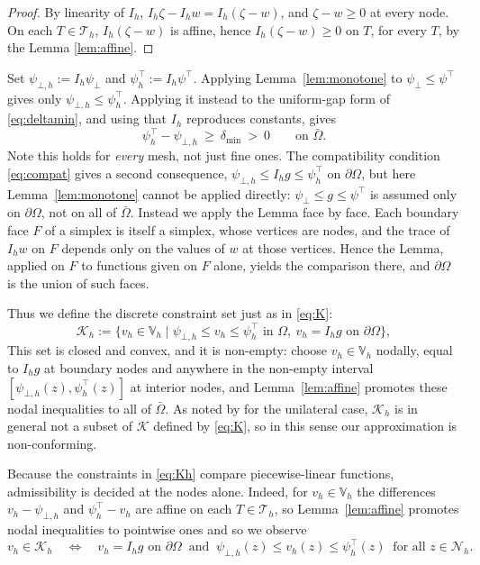 \documentclass[12pt]{amsart}
\theoremstyle{definition}
\newcommand{\Om}{\Omega}
\newcommand{\dOm}{\partial\Omega}
\newcommand{\psilo}{\psi_\bot}
\newcommand{\psiup}{\psi^\top}
\newcommand{\psiloh}{\psi_{\bot,h}}
\newcommand{\psiuph}{\psi^\top_h}
\newcommand{\Th}{\mathcal{T}_h}
\newcommand{\Vh}{\mathbb{V}_h}
\newcommand{\Nh}{\mathcal{N}_h}
\newcommand{\Ih}{I_h}
\newcommand{\Kh}{\mathcal{K}_h}
\begin{document}
\begin{proof}
By linearity of $\Ih$, $\Ih \zeta - \Ih w = \Ih(\zeta - w)$, and $\zeta - w \ge 0$ at every node. On each $T \in \Th$, $\Ih(\zeta-w)$ is affine, hence $\Ih(\zeta-w) \ge 0$ on $T$, for every $T$, by the Lemma \ref{lem:affine}.
\end{proof}

Set $\psiloh := \Ih \psilo$ and $\psiuph := \Ih \psiup$.  Applying Lemma~\ref{lem:monotone} to $\psilo \le \psiup$ gives only $\psiloh \le \psiuph$.  Applying it instead to the uniform-gap form of \eqref{eq:deltamin}, and using that $\Ih$ reproduces constants, gives
\begin{equation}
\label{eq:disc-nondeg}
  \psiuph - \psiloh \ \ge\ \delta_{\min} \ >\ 0 \qquad \text{on } \bar\Om.
\end{equation}
Note this holds for \emph{every} mesh, not just fine ones. The compatibility condition \eqref{eq:compat} gives a second consequence, $\psiloh \le \Ih g \le \psiuph$ on $\dOm$, but here Lemma~\ref{lem:monotone} cannot be applied directly: $\psilo \le g \le \psiup$ is assumed only on $\dOm$, not on all of $\bar\Om$.  Instead we apply the Lemma face by face.  Each boundary face $F$ of a simplex is itself a simplex, whose vertices are nodes, and the trace of $\Ih w$ on $F$ depends only on the values of $w$ at those vertices.  Hence the Lemma, applied on $F$ to functions given on $F$ alone, yields the comparison there, and $\dOm$ is the union of such faces.

Thus we define the discrete constraint set just as in \eqref{eq:K}:
\begin{equation}
\label{eq:Kh}
  \Kh := \{v_h \in \Vh \mid \psiloh \le v_h \le \psiuph \text{ in } \Om,
    \ v_h = \Ih g \text{ on } \dOm\},
\end{equation}
This set is closed and convex, and it is non-empty: choose $v_h \in \Vh$ nodally, equal to $\Ih g$ at boundary nodes and anywhere in the non-empty interval $[\psiloh(z),\psiuph(z)]$ at interior nodes, and Lemma~\ref{lem:affine} promotes these nodal inequalities to all of $\bar\Om$.  As noted by \cite{NSV03} for the unilateral case, $\Kh$ is in general not a subset of $\mathcal{K}$ defined by \eqref{eq:K}, so in this sense our approximation is non-conforming.

Because the constraints in \eqref{eq:Kh} compare piecewise-linear functions, admissibility is decided at the nodes alone.  Indeed, for $v_h \in \Vh$ the differences $v_h - \psiloh$ and $\psiuph - v_h$ are affine on each $T \in \Th$, so Lemma~\ref{lem:affine} promotes nodal inequalities to pointwise ones and so we observe
\begin{equation}
\label{eq:nodalKh}
  v_h \in \Kh \quad\iff\quad v_h = \Ih g \text{ on } \dOm \ \text{ and } \ \psiloh(z) \le v_h(z) \le \psiuph(z) \ \text{ for all } z \in \Nh.
\end{equation}
\end{document}

